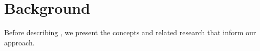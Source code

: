 \section{Background}
\label{sec: related-work}
Before describing \coach, we present the concepts and related research that inform our approach. 



